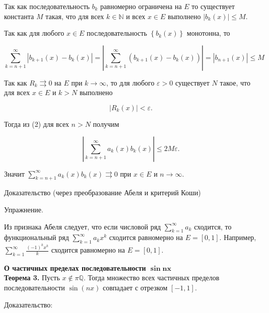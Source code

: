 \documentclass[a4paper,12pt]{article} %
\begin{document}
	Так как последовательность $b_{k}$ равномерно ограничена на $E$ то существует константа $M$ такая, что для всех $k \in \mathbb{N}$ и всех $x \in E$ выполнено $\left|b_{k}(x)\right| \leq M$.
	
	Так как для любого $x \in E$ последовательность $\left\{b_{k}(x)\right\}$ монотонна, то
	
	$$
	\sum_{k=n+1}^{\infty}\left|b_{k+1}(x)-b_{k}(x)\right|=\left|\sum_{k=n+1}^{\infty}\left(b_{k+1}(x)-b_{k}(x)\right)\right|=\left|b_{n+1}(x)\right| \leq M
	$$
	
	Так как $R_{k} \rightrightarrows 0$ на $E$ при $k \rightarrow \infty$, то для любого $\varepsilon>0$ существует $N$ такое, что для всех $x \in E$ и $k>N$ выполнено
	
	$$
	\left|R_{k}(x)\right|<\varepsilon .
	$$
	
	Тогда из (2) для всех $n>N$ получим
	
	$$
	\left|\sum_{k=n+1}^{\infty} a_{k}(x) b_{k}(x)\right| \leq 2 M \varepsilon .
	$$
	
	Значит $\sum_{k=n+1}^{\infty} a_{k}(x) b_{k}(x) \rightrightarrows 0$ при $x \in E$ и $n \rightarrow \infty$.
	
	Доказательство (через преобразование Абеля и критерий Коши)
	
	Упражнение.
	
	Из признака Абеля следует, что если числовой ряд $\sum_{k=1}^{\infty} a_{k}$ сходится, то функциональный ряд $\sum_{k=1}^{\infty} a_{k} x^{k}$ сходится равномерно на $E=[0,1]$. Например, $\sum_{k=1}^{\infty} \frac{(-1)^{k} x^{k}}{k}$ сходится равномерно на $E=[0,1]$.
	
	\textbf{О частичных пределах последовательности $\mathbf{\sin n x}$}\\
	\textbf{Теорема 3.} Пусть $x \notin \pi \mathbb{Q}$. Тогда множество всех частичных пределов последовательности $\sin (n x)$ совпадает с отрезком $[-1,1]$.
	

	Доказательство:\\
	
\end{document}
